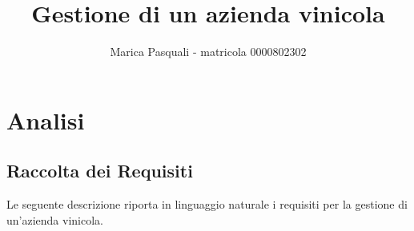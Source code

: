 \documentclass{article}
\title{Gestione di un azienda vinicola}
\author{Marica Pasquali - matricola 0000802302}
\begin{document}
\maketitle

\tableofcontents
\newpage

\section{Analisi}

\subsection{Raccolta dei Requisiti}
Le seguente descrizione riporta in linguaggio naturale i requisiti per la gestione di un'azienda vinicola.\\
\newline
\newline
\end{document}
